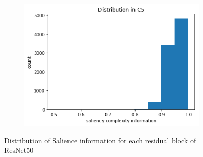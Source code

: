 \documentclass[conference]{IEEEtran}
\begin{document}
\begin{figure}[h!]
\begin{subfigure}[b]{0.4\linewidth}
   	\end{subfigure}
  	\begin{subfigure}[b]{0.4\linewidth}
    	\includegraphics[width=\linewidth]{C5.png}
  	\end{subfigure}
  	\caption{Distribution of Salience information for each residual block of ResNet50}
  	\label{fig:sample data}
	\end{figure}
	
\end{document}
